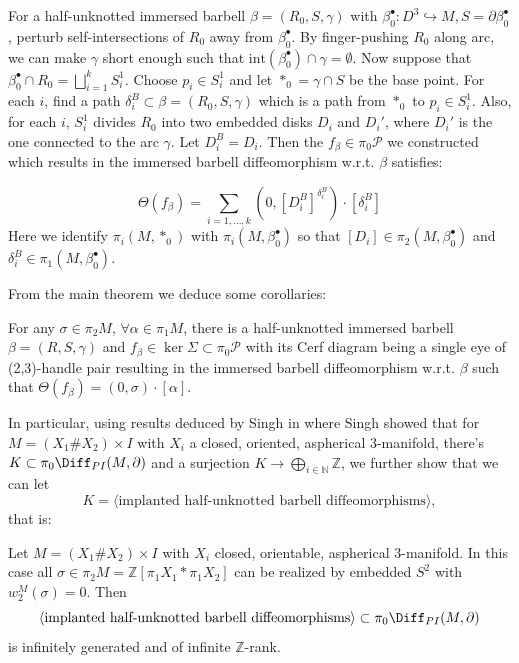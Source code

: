 \begin{theorem}
    For a half-unknotted immersed barbell $\beta=(R_0,S,\gamma)$ with $\beta_0^\bullet: D^3\hookrightarrow M, S=\partial\beta_0^\bullet $, perturb self-intersections of $R_0$ away from $\beta_0^\bullet$. By finger-pushing $R_0$ along arc, we can make $\gamma$ short enough such that $\text{int}(\beta_0^\bullet)\cap \gamma =\emptyset$. Now suppose that $\beta_0^\bullet \cap R_0=\bigsqcup _{i=1}^k S_i^1$. Choose $p_i\in S_i^1$ and let $*_0=\gamma\cap S$ be the base point. For each $i$, find a path $\delta^B_i\subset \beta=(R_0, S,\gamma)$ which is a path from $*_0$ to $p_i\in S_i^1$. Also, for each $i$, $S_i^1$ divides $R_0$ into two embedded disks $D_i$ and $D_i'$, where $D_i'$ is the one connected to the arc $\gamma$. Let $D^B_i=D_i$. Then the $f_\beta\in \pi_0\mathcal{P}$ we constructed which results in the immersed barbell diffeomorphism w.r.t. $\beta$ satisfies:
    
    $$\Theta(f_\beta)=\sum_{i=1,...,k} (0, [D^B_i]^{\delta_i^B})\cdot  [\delta_i^B]$$
    Here we identify $\pi_i(M,*_0)$ with $\pi_i(M, \beta_0^\bullet)$ so that $[D_i]\in \pi_2(M,\beta_0^\bullet)$ and $\delta_i^B\in \pi_1(M,\beta_0^\bullet)$.    
\end{theorem}

From the main theorem we deduce some corollaries: 
\begin{corollary}
    For any $\sigma\in \pi_2 M$, $\forall \alpha\in \pi_1 M$, there is a half-unknotted immersed barbell $\beta=(R, S, \gamma)$ and $f_\beta\in \ker\Sigma\subset \pi_0\mathcal{P}$ with its Cerf diagram being a single eye of (2,3)-handle pair resulting in the immersed barbell diffeomorphism w.r.t. $\beta$ such that $\Theta(f_\beta)=(0,\sigma)\cdot [\alpha]$.
\end{corollary}

In particular, using results deduced by Singh in \cite{singh2022pseudoisotopiesdiffeomorphisms4manifolds} where Singh showed that for $M=(X_1\# X_2)\times I$ with $X_i$ a closed, oriented, aspherical 3-manifold, there's $K\subset \pi_0\Diff_{PI}(M,\partial)$ and a surjection $K\to \bigoplus_{i\in \mathbb{N}} \mathbb{Z}$, we further show that we can let
\[
  K=\langle\text{implanted half-unknotted barbell diffeomorphisms}\rangle,
\]
that is:

\begin{corollary}
    Let $M=(X_1\# X_2)\times I$ with $X_i$ closed, orientable, aspherical 3-manifold. In this case all $\sigma\in \pi_2 M=\mathbb{Z}[\pi_1 X_1*\pi_1 X_2]$ can be realized by embedded $S^2$ with $w_2^M(\sigma)=0$. Then $$\langle\text{implanted half-unknotted barbell diffeomorphisms}\rangle\subset \pi_0\Diff_{PI}(M,\partial)$$ is infinitely generated and of infinite $\mathbb{Z}$-rank. 
\end{corollary}

